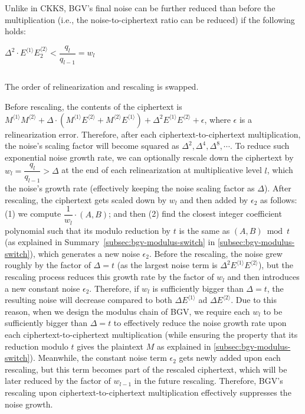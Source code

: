 \begin{tcolorbox}[title={\textbf{\tboxlabel{\ref*{subsec:bgv-mult-cipher}} BGV Ciphertext-to-Ciphertext Multiplication}}]
\begin{enumerate}
$ $

Unlike in CKKS, BGV's final noise can be further reduced than before the multiplication (i.e., the noise-to-ciphertext ratio can be reduced) if the following holds:

$ \Delta^2 \cdot E^{\langle 1 \rangle} E_2^{\langle 2 \rangle}  < \dfrac{q_l}{q_{l-1}} = w_l$

$ $

The order of relinearization and rescaling is swapped. 

\end{enumerate}
\end{tcolorbox}

 Before rescaling, the contents of the ciphertext is $M^{\langle 1 \rangle}M^{\langle 2 \rangle} + \Delta\cdot (M^{\langle 1 \rangle}E^{\langle 2 \rangle} + M^{\langle 2 \rangle}E^{\langle 1 \rangle}) + \Delta^2E^{\langle 1 \rangle}E^{\langle 2 \rangle} + \epsilon$, where $\epsilon$ is a relinearization error. Therefore, after each ciphertext-to-ciphertext multiplication, the noise's scaling factor will become squared as $\Delta^2, \Delta^4, \Delta^8, \cdots$. To reduce such exponential noise growth rate, we can optionally rescale down the ciphertext by $w_l = \dfrac{q_l}{q_{l-1}} > \Delta$ at the end of each relinearization at multiplicative level $l$, which the noise's growth rate (effectively keeping the noise scaling factor as $\Delta$). After rescaling, the ciphertext gets scaled down by $w_l$ and then added by $\epsilon_2$ as follows: (1) we compute $\dfrac{1}{w_l}\cdot(A, B)$; and then (2) find the closest integer coefficient polynomial such that its modulo reduction by $t$ is the same as $(A, B) \bmod t$ (as explained in Summary~\ref*{subsec:bgv-modulus-switch} in \autoref{subsec:bgv-modulus-switch}), which generates a new noise $\epsilon_2$. Before the rescaling, the noise grew roughly by the factor of $\Delta = t$ (as the largest noise term is $\Delta^2 E^{\langle 1 \rangle} E^{\langle 2 \rangle}$), but the rescaling process reduces this growth rate by the factor of $w_l$ and then introduces a new constant noise $\epsilon_2$. Therefore, if $w_l$ is sufficiently bigger than $\Delta = t$, the resulting noise will decrease compared to both $\Delta E^{\langle 1 \rangle}$ ad $\Delta E^{\langle 2 \rangle}$. Due to this reason, when we design the modulus chain of BGV, we require each $w_l$ to be sufficiently bigger than $\Delta = t$ to effectively reduce the noise growth rate upon each ciphertext-to-ciphertext multiplication (while ensuring the property that its reduction modulo $t$ gives the plaintext $M$ as explained in \autoref{subsec:bgv-modulus-switch}). Meanwhile, the constant noise term $\epsilon_2$ gets newly added upon each rescaling, but this term becomes part of the rescaled ciphertext, which will be later reduced by the factor of $w_{l-1}$ in the future rescaling. Therefore, BGV's rescaling upon ciphertext-to-ciphertext multiplication effectively suppresses the noise growth. 

